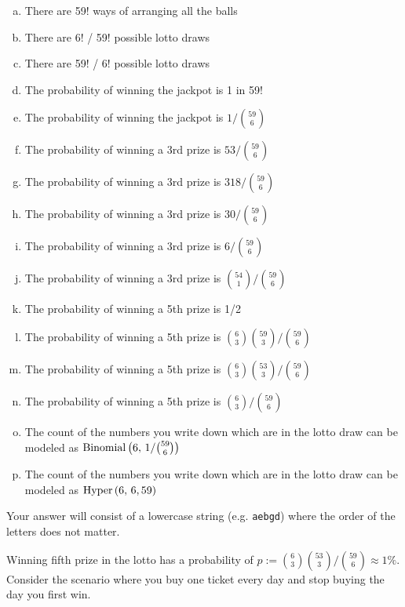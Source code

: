 \documentclass[12pt,landscape]{article}
\newcommand{\instr}{\small Your answer will consist of a lowercase string (e.g. \texttt{aebgd}) where the order of the letters does not matter. \normalsize}
\begin{document}
\vspace{-0.2cm}\benum{} 
\begin{enumerate}[(a)]
\item There are 59! ways of arranging all the balls
\item There are 6! / 59! possible lotto draws
\item There are 59! / 6! possible lotto draws
\item The probability of winning the jackpot is 1 in 59!
\item The probability of winning the jackpot is $1 / \binom{59}{6}$
\item The probability of winning a 3rd prize is $53 / \binom{59}{6}$
\item The probability of winning a 3rd prize is $318 / \binom{59}{6}$
\item The probability of winning a 3rd prize is $30 / \binom{59}{6}$
\item The probability of winning a 3rd prize is $6 / \binom{59}{6}$
\item The probability of winning a 3rd prize is $\binom{54}{1} / \binom{59}{6}$
\item The probability of winning a 5th prize is 1/2
\item The probability of winning a 5th prize is $\binom{6}{3}\binom{59}{3} / \binom{59}{6}$
\item The probability of winning a 5th prize is $\binom{6}{3}\binom{53}{3} / \binom{59}{6}$
\item The probability of winning a 5th prize is $\binom{6}{3} / \binom{59}{6}$
\item The count of the numbers you write down which are in the lotto draw can be modeled as $\mathrm{Binomial}\left(6,\,1/ \binom{59}{6}\right)$
\item The count of the numbers you write down which are in the lotto draw can be modeled as $\mathrm{Hyper}\left(6,\,6,59\right)$
\end{enumerate}
\eenum\instr\pagebreak


\problem{} Winning fifth prize in the lotto has a probability of $p := \binom{6}{3} \binom{53}{3} /  \binom{59}{6} \approx 1\%$. Consider the scenario where you buy one ticket every day and stop buying the day you first win.
\end{document}
